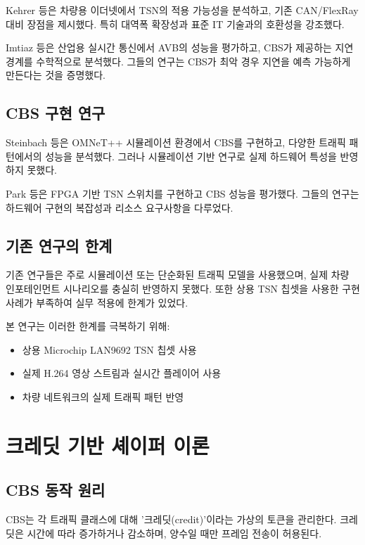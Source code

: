 \documentclass[10pt,twocolumn]{IEEEtran}
\begin{document}
Kehrer 등\cite{kehrer2014}은 차량용 이더넷에서 TSN의 적용 가능성을 분석하고, 기존 CAN/FlexRay 대비 장점을 제시했다. 특히 대역폭 확장성과 표준 IT 기술과의 호환성을 강조했다.

Imtiaz 등\cite{imtiaz2009}은 산업용 실시간 통신에서 AVB의 성능을 평가하고, CBS가 제공하는 지연 경계를 수학적으로 분석했다. 그들의 연구는 CBS가 최악 경우 지연을 예측 가능하게 만든다는 것을 증명했다.

\subsection{CBS 구현 연구}

Steinbach 등\cite{steinbach2011}은 OMNeT++ 시뮬레이션 환경에서 CBS를 구현하고, 다양한 트래픽 패턴에서의 성능을 분석했다. 그러나 시뮬레이션 기반 연구로 실제 하드웨어 특성을 반영하지 못했다.

Park 등\cite{park2022}은 FPGA 기반 TSN 스위치를 구현하고 CBS 성능을 평가했다. 그들의 연구는 하드웨어 구현의 복잡성과 리소스 요구사항을 다루었다.

\subsection{기존 연구의 한계}

기존 연구들은 주로 시뮬레이션 또는 단순화된 트래픽 모델을 사용했으며, 실제 차량 인포테인먼트 시나리오를 충실히 반영하지 못했다. 또한 상용 TSN 칩셋을 사용한 구현 사례가 부족하여 실무 적용에 한계가 있었다.

본 연구는 이러한 한계를 극복하기 위해:
\begin{itemize}
\item 상용 Microchip LAN9692 TSN 칩셋 사용
\item 실제 H.264 영상 스트림과 실시간 플레이어 사용
\item 차량 네트워크의 실제 트래픽 패턴 반영
\end{itemize}

\section{크레딧 기반 셰이퍼 이론}

\subsection{CBS 동작 원리}

CBS는 각 트래픽 클래스에 대해 '크레딧(credit)'이라는 가상의 토큰을 관리한다. 크레딧은 시간에 따라 증가하거나 감소하며, 양수일 때만 프레임 전송이 허용된다.
\end{document}
